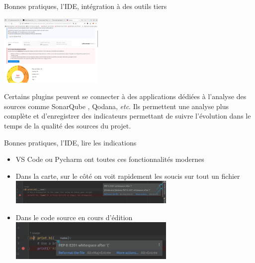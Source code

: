 \documentclass{beamer}
\begin{document}
    \begin{frame}{Bonnes pratiques, l'IDE, intégration à des outils tiers}

        \centering
        \includegraphics[width=5cm]{image/Qodana-result}

        \bigbreak

        \begin{flushleft}
            Certains plugins peuvent se connecter à des applications dédiées à l'analyse des sources comme SonarQube , Qodana, \textit{etc}.
            Ils permettent une analyse plus complète et d'enregistrer des indicateurs permettant de suivre l'évolution dans le temps de la qualité des sources du projet.
        \end{flushleft}
    \end{frame}

    \begin{frame}{Bonnes pratiques, l'IDE, lire les indications}

        \begin{itemize}
            \item VS Code ou Pycharm ont toutes ces fonctionnalités modernes
            \item Dans la carte, sur le côté on voit rapidement les soucis sur tout un fichier
            \bigbreak
            \includegraphics[width=8cm]{image/Pycharm-minimap}
            \item Dans le code source en cours d'édition
            \bigbreak
            \includegraphics[width=8cm]{image/Pycharm-waring-in-code}
        \end{itemize}

    \end{frame}
\end{document}
